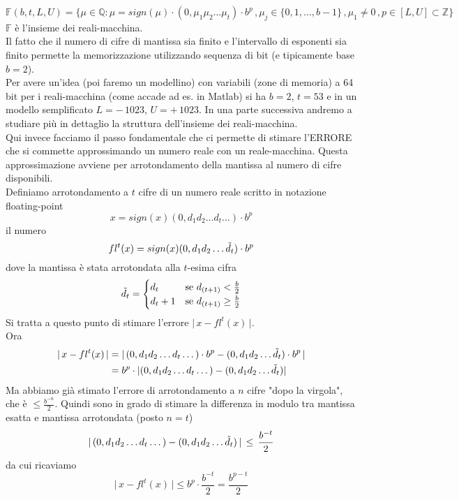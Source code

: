 \documentclass[12pt]{article}
\begin{document}
\[ \mathbb{F} (b, t, L, U) = \{ \mu \in \mathbb{Q} \colon \mu = sign(\mu)\cdot(0,\mu_1 \mu_2 \dotsc \mu_t) \cdot b^p \,, \mu_j \in \{0, 1, \dotsc , b-1\} \,, \mu_1 \ne 0 \,, p \in [L,U] \subset \mathbb{Z} \} \]
$\mathbb{F}$ è l'insieme dei reali-macchina.\\
Il fatto che il numero di cifre di mantissa sia finito e l'intervallo di esponenti sia finito permette la memorizzazione utilizzando sequenza di bit (e tipicamente base $b=2$). \\
Per avere un'idea (poi faremo un modellino) con variabili (zone di memoria) a 64 bit per i reali-macchina (come accade ad es. in Matlab) si ha $b=2$, $t=53$ e in un modello semplificato $L=-\,1023$, $U=+\,1023$. In una parte successiva andremo a studiare più in dettaglio la struttura dell'insieme dei reali-macchina.\\
Qui invece facciamo il passo fondamentale che ci permette di stimare l'ERRORE che si commette approssimando un numero reale con un reale-macchina. Questa approssimazione avviene per arrotondamento della mantissa al numero di cifre disponibili. \\
Definiamo arrotondamento a $t$ cifre di un numero reale scritto in notazione floating-point \[ x = sign(x)(0,d_1 d_2 \dotsc d_t \dotsc) \cdot b^p \]
il numero \[ fl^t(x) = sign(x)(0,d_1 d_2 \dotsc \Tilde{d}_t) \cdot b^p \]
dove la mantissa è stata arrotondata alla $t$-esima cifra
\[\Tilde{d}_t = 
\begin{cases}
    d_t & \text{se $d_{(t+1)} < \frac{b}{2}$} \\
    d_t+1 & \text{se $d_{(t+1)} \ge \frac{b}{2}$}
\end{cases}
\]
Si tratta a questo punto di stimare l'errore $\lvert \, x - fl^t(x) \, \rvert$.\\
Ora
\[ \begin{split}
    \lvert \, x - fl^t(x) \, \rvert & = \lvert \, (0,d_1 d_2 \dotsc d_t \dotsc) \cdot b^p - (0,d_1 d_2 \dotsc \Tilde{d}_t) \cdot b^p \, \rvert \\
    & = b^p \cdot \lvert (0,d_1 d_2 \dotsc d_t \dotsc) - (0,d_1 d_2 \dotsc \Tilde{d}_t) \rvert
    \end{split}\]
Ma abbiamo già stimato l'errore di arrotondamento a $n$ cifre "dopo la virgola", che è $\le \frac{b^{-n}}{2}$. Quindi sono in grado di stimare la differenza in modulo tra mantissa esatta e mantissa arrotondata (posto $n = t$)
\[ \lvert \, (0,d_1 d_2 \dotsc d_t \dotsc) - (0,d_1 d_2 \dotsc \Tilde{d}_t) \, \rvert \, \le \, \frac{b^{-t}}{2} \] da cui ricaviamo
\[ \lvert \, x - fl^t(x) \, \rvert \le b^p \cdot \frac{b^{-t}}{2} = \frac{b^{p-t}}{2} \]
\end{document}
